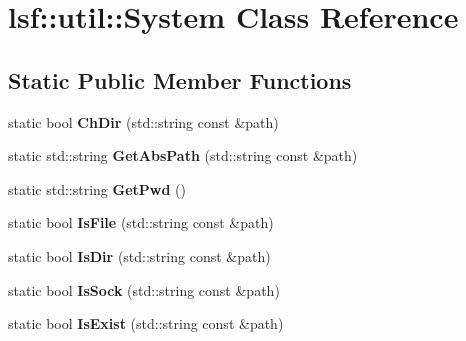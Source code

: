 \hypertarget{classlsf_1_1util_1_1System}{
\section{lsf::util::System Class Reference}
\label{classlsf_1_1util_1_1System}
}
\subsection*{Static Public Member Functions}
\begin{DoxyCompactItemize}
\item 
\hypertarget{classlsf_1_1util_1_1System_a6b7a78dcaf43c9f4144b6a64f67b33bf}{
static bool {\bfseries ChDir} (std::string const \&path)}
\label{classlsf_1_1util_1_1System_a6b7a78dcaf43c9f4144b6a64f67b33bf}

\item 
\hypertarget{classlsf_1_1util_1_1System_ad8fd013c23da964ebfb946050cb892d8}{
static std::string {\bfseries GetAbsPath} (std::string const \&path)}
\label{classlsf_1_1util_1_1System_ad8fd013c23da964ebfb946050cb892d8}

\item 
\hypertarget{classlsf_1_1util_1_1System_afa1cb7e7e9a06228599a6e1b66739bd1}{
static std::string {\bfseries GetPwd} ()}
\label{classlsf_1_1util_1_1System_afa1cb7e7e9a06228599a6e1b66739bd1}

\item 
\hypertarget{classlsf_1_1util_1_1System_a486e4d16505ba926a33d43772294bb25}{
static bool {\bfseries IsFile} (std::string const \&path)}
\label{classlsf_1_1util_1_1System_a486e4d16505ba926a33d43772294bb25}

\item 
\hypertarget{classlsf_1_1util_1_1System_ac1e38674a9b4ba5f5f50e5ef749b1d27}{
static bool {\bfseries IsDir} (std::string const \&path)}
\label{classlsf_1_1util_1_1System_ac1e38674a9b4ba5f5f50e5ef749b1d27}

\item 
\hypertarget{classlsf_1_1util_1_1System_a899ee2ad237684e4807f94f5ed1fc7f8}{
static bool {\bfseries IsSock} (std::string const \&path)}
\label{classlsf_1_1util_1_1System_a899ee2ad237684e4807f94f5ed1fc7f8}

\item 
\hypertarget{classlsf_1_1util_1_1System_abae151fde34e8297cdc5a1105d015869}{
static bool {\bfseries IsExist} (std::string const \&path)}
\label{classlsf_1_1util_1_1System_abae151fde34e8297cdc5a1105d015869}


\end{DoxyCompactItemize}

